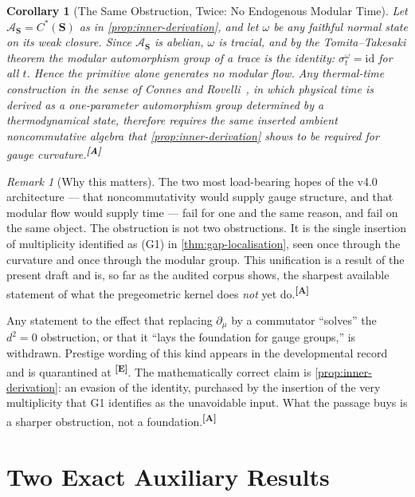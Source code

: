 \documentclass[12pt,a4paper,twoside]{article}
\theoremstyle{plain}
\newtheorem{corollary}[theorem]{Corollary}
\theoremstyle{definition}
\theoremstyle{remark}
\newtheorem{remark}[theorem]{Remark}
\newcommand{\catmark}[1]{\textsuperscript{\textsf{\textbf{[#1]}}}}
\begin{document}
\begin{corollary}[The Same Obstruction, Twice: No Endogenous Modular Time]
\label{cor:modular-relocation}
Let $\mathcal A_{\mathbf S} = C^{\ast}(\mathbf S)$ as in
\cref{prop:inner-derivation}, and let $\omega$ be any faithful normal
state on its weak closure. Since $\mathcal A_{\mathbf S}$ is abelian,
$\omega$ is tracial, and by the Tomita--Takesaki theorem the modular
automorphism group of a trace is the identity: $\sigma^{\omega}_t =
\mathrm{id}$ for all $t$. Hence the primitive alone generates no modular
flow. Any thermal-time construction in the sense of Connes and
Rovelli~\cite{connesrovelli1994}, in which physical time is derived as a
one-parameter automorphism group determined by a thermodynamical state,
therefore requires the same inserted ambient noncommutative algebra that
\cref{prop:inner-derivation} shows to be required for gauge
curvature.\catmark{A}
\end{corollary}

\begin{remark}[Why this matters]
\label{rem:one-obstruction}
The two most load-bearing hopes of the v4.0 architecture --- that
noncommutativity would supply gauge structure, and that modular flow
would supply time --- fail for one and the same reason, and fail on the
same object. The obstruction is not two obstructions. It is the single
insertion of multiplicity identified as (G1) in
\cref{thm:gap-localisation}, seen once through the curvature and once
through the modular group. This unification is a result of the present
draft and is, so far as the audited corpus shows, the sharpest available
statement of what the pregeometric kernel does \emph{not} yet
do.\catmark{A}
\end{remark}

\begin{governancebox}
Any statement to the effect that replacing $\partial_\mu$ by a
commutator ``solves'' the $d^2 = 0$ obstruction, or that it ``lays the
foundation for gauge groups,'' is withdrawn. Prestige wording of this
kind appears in the developmental record and is quarantined at
\catmark{E}. The mathematically correct claim is
\cref{prop:inner-derivation}: an evasion of the identity, purchased by
the insertion of the very multiplicity that G1 identifies as the
unavoidable input. What the passage buys is a sharper obstruction, not a
foundation.\catmark{A}
\end{governancebox}

\section{Two Exact Auxiliary Results}
\label{sec:auxiliary-exact}
\end{document}
